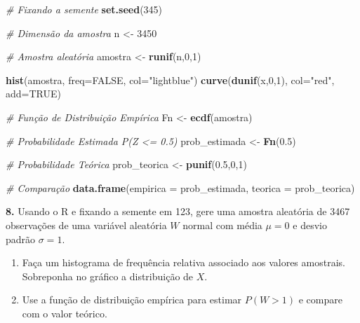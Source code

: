 \documentclass[
]{book}
\newenvironment{Shaded}{\begin{snugshade}}{\end{snugshade}}
\newcommand{\AttributeTok}[1]{\textcolor[rgb]{0.13,0.29,0.53}{#1}}
\newcommand{\CommentTok}[1]{\textcolor[rgb]{0.56,0.35,0.01}{\textit{#1}}}
\newcommand{\ConstantTok}[1]{\textcolor[rgb]{0.56,0.35,0.01}{#1}}
\newcommand{\DecValTok}[1]{\textcolor[rgb]{0.00,0.00,0.81}{#1}}
\newcommand{\FloatTok}[1]{\textcolor[rgb]{0.00,0.00,0.81}{#1}}
\newcommand{\FunctionTok}[1]{\textcolor[rgb]{0.13,0.29,0.53}{\textbf{#1}}}
\newcommand{\NormalTok}[1]{#1}
\newcommand{\OtherTok}[1]{\textcolor[rgb]{0.56,0.35,0.01}{#1}}
\newcommand{\StringTok}[1]{\textcolor[rgb]{0.31,0.60,0.02}{#1}}
\begin{document}
\begin{Shaded}
\begin{Highlighting}[]
\CommentTok{\# Fixando a semente}
\FunctionTok{set.seed}\NormalTok{(}\DecValTok{345}\NormalTok{)}

\CommentTok{\# Dimensão da amostra}
\NormalTok{n }\OtherTok{\textless{}{-}} \DecValTok{3450}

\CommentTok{\# Amostra aleatória}
\NormalTok{amostra }\OtherTok{\textless{}{-}} \FunctionTok{runif}\NormalTok{(n,}\DecValTok{0}\NormalTok{,}\DecValTok{1}\NormalTok{)}

\FunctionTok{hist}\NormalTok{(amostra, }\AttributeTok{freq=}\ConstantTok{FALSE}\NormalTok{, }\AttributeTok{col=}\StringTok{"lightblue"}\NormalTok{)}
\FunctionTok{curve}\NormalTok{(}\FunctionTok{dunif}\NormalTok{(x,}\DecValTok{0}\NormalTok{,}\DecValTok{1}\NormalTok{), }\AttributeTok{col=}\StringTok{"red"}\NormalTok{, }\AttributeTok{add=}\ConstantTok{TRUE}\NormalTok{)}

\CommentTok{\# Função de Distribuição Empírica}
\NormalTok{Fn }\OtherTok{\textless{}{-}} \FunctionTok{ecdf}\NormalTok{(amostra)}

\CommentTok{\# Probabilidade Estimada P(Z \textless{}= 0.5)}
\NormalTok{prob\_estimada }\OtherTok{\textless{}{-}} \FunctionTok{Fn}\NormalTok{(}\FloatTok{0.5}\NormalTok{)}

\CommentTok{\# Probabilidade Teórica}
\NormalTok{prob\_teorica }\OtherTok{\textless{}{-}} \FunctionTok{punif}\NormalTok{(}\FloatTok{0.5}\NormalTok{,}\DecValTok{0}\NormalTok{,}\DecValTok{1}\NormalTok{)}

\CommentTok{\# Comparação}
\FunctionTok{data.frame}\NormalTok{(}\AttributeTok{empirica =}\NormalTok{ prob\_estimada, }\AttributeTok{teorica =}\NormalTok{ prob\_teorica)}
\end{Highlighting}
\end{Shaded}

\textbf{8.} Usando o R e fixando a semente em 123, gere uma amostra aleatória
de 3467 observações de uma variável aleatória \(W\) normal com média
\(\mu = 0\) e desvio padrão \(\sigma = 1\).

\begin{enumerate}
\def\labelenumi{(\alph{enumi})}
\item
  Faça um histograma de frequência relativa associado aos valores
  amostrais. Sobreponha no gráfico a distribuição de \(X\).
\item
  Use a função de distribuição empírica para estimar \(P(W > 1)\) e
  compare com o valor teórico.
\end{enumerate}
\end{document}
